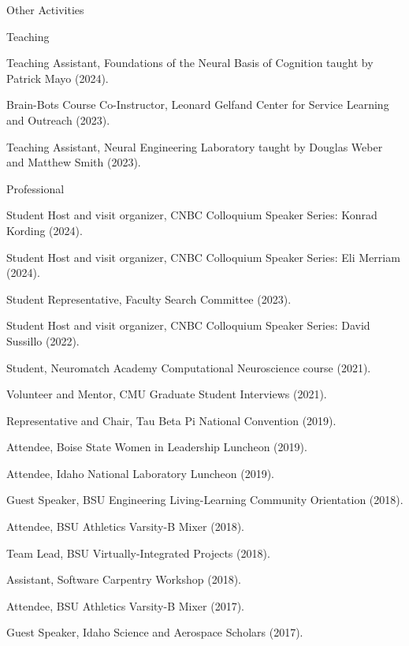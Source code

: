 \documentclass{resume} %
\begin{document}
\begin{rSection}{Other Activities}
\begin{rSubsection2}{Teaching}{}{}{}
\item Teaching Assistant, Foundations of the Neural Basis of Cognition taught by Patrick Mayo (2024).
\item Brain-Bots Course Co-Instructor, Leonard Gelfand Center for Service Learning and Outreach (2023).
\item Teaching Assistant, Neural Engineering Laboratory taught by Douglas Weber and Matthew Smith (2023).
\end{rSubsection2}
\newpage
\begin{rSubsection2}{Professional}{}{}{}
\item Student Host and visit organizer, CNBC Colloquium Speaker Series: Konrad Kording (2024).
\item Student Host and visit organizer, CNBC Colloquium Speaker Series: Eli Merriam (2024).
\item Student Representative, Faculty Search Committee (2023).
\item Student Host and visit organizer, CNBC Colloquium Speaker Series: David Sussillo (2022).
\item Student, Neuromatch Academy Computational Neuroscience course (2021).
\item Volunteer and Mentor, CMU Graduate Student Interviews (2021).
\item Representative and Chair, Tau Beta Pi National Convention (2019). 
\item Attendee, Boise State Women in Leadership Luncheon (2019).
\item Attendee, Idaho National Laboratory Luncheon (2019).
\item Guest Speaker, BSU Engineering Living-Learning Community Orientation (2018).
\item Attendee, BSU Athletics Varsity-B Mixer (2018).
\item Team Lead, BSU Virtually-Integrated Projects (2018).
\item Assistant, Software Carpentry Workshop (2018).
\item Attendee, BSU Athletics Varsity-B Mixer (2017).
\item Guest Speaker, Idaho Science and Aerospace Scholars (2017).
\end{rSubsection2}


\end{rSection}
\end{document}

